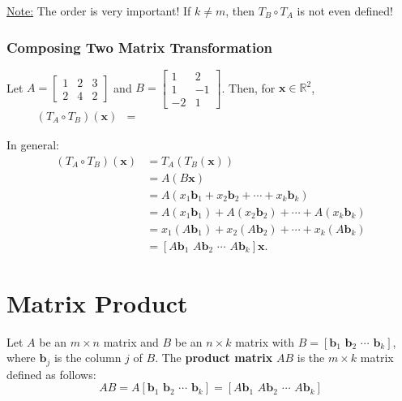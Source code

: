 \documentclass[20pt,a4paper]{extarticle}
\newcounter{definition}[section]
\begin{document}
\underline{Note:} The order is very important! If $k \neq m$, then $T_B \circ T_A$ is not even defined!

\newpage 

\subsubsection{Composing Two Matrix Transformation}
Let $A = \begin{bmatrix} 1 & 2 & 3 \\ 2 & 4 & 2 \end{bmatrix}$ and $B = \begin{bmatrix} 1 & 2 \\ 1 & -1 \\ -2 & 1 \end{bmatrix}$. Then, for $\mathbf{x} \in \mathbb{R}^2$, 
	\begin{align*}
	(T_A \circ T_B ) (\mathbf{x}) &= \qquad\qquad\qquad\qquad\qquad\qquad\qquad\qquad\qquad\qquad\qquad
	\end{align*}

\vfill 

In general:
	\begin{align*}
	(T_A \circ T_B) (\mathbf{x}) &= T_A (T_B (\mathbf{x})) \\ 
	&= A (B \mathbf{x}) \\ 
	&= A (x_1 \mathbf{b}_1 + x_2 \mathbf{b}_2 + \cdots + x_k \mathbf{b}_k) \\ 
	&= A (x_1 \mathbf{b}_1) + A (x_2 \mathbf{b}_2) + \cdots + A (x_k \mathbf{b}_k) \\ 
	&= x_1 (A\mathbf{b}_1) + x_2 (A\mathbf{b}_2) + \cdots + x_k (A \mathbf{b}_k) \\ 
	&= [ A\mathbf{b}_1 \,\,  A\mathbf{b}_2 \,\, \cdots \,\, A \mathbf{b}_k ] \mathbf{x} .
	\end{align*}

\newpage 

\section{Matrix Product}

\begin{definition}
Let $A$ be an $m \times n$ matrix and $B$ be an $n \times k$ matrix with $B = [ \mathbf{b}_1 \,\, \mathbf{b}_2 \,\, \cdots \,\, \mathbf{b}_k ]$, where $\mathbf{b}_j$ is the column $j$ of $B$. The \textbf{product matrix} $AB$ is the $m \times k$ matrix defined as follows:
	\[
		AB = A [ \mathbf{b}_1 \,\, \mathbf{b}_2 \,\, \cdots \,\, \mathbf{b}_k ] = [ A\mathbf{b}_1 \,\,  A\mathbf{b}_2 \,\, \cdots \,\, A \mathbf{b}_k ]
	\]
\end{definition}
\end{document}
